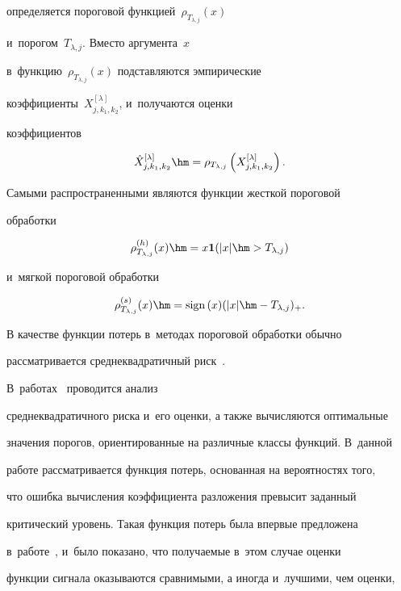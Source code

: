 определяется пороговой функцией~$\rho_{T_{\lambda,j}}(x)$ 


и~порогом~$T_{\lambda,j}$. Вместо аргумента~$x$ 


в~функцию~$\rho_{T_{\lambda,j}}(x)$ подставляются эмпирические  


ко\-эф\-фи\-ци\-ен\-ты~$X_{j,k_1,k_2}^{[\lambda]}$, и~получаются оценки 


коэффициентов 


$$


\hat{X}_{j,k_1,k_2}^{[\lambda]}\hm=\rho_{T_{\lambda,j}}\left(X_{j,k_1,k_2}^{[


\lambda]}\right).


$$


%


 Самыми распространенными являются функции жесткой пороговой 


обработки 


$$


\rho_{T_{\lambda,j}}^{(h)}(x)\hm=x \mathbf{1} 


(|x|\hm>T_{\lambda,j})$$ 


и~мягкой пороговой обработки 


$$


\rho_{T_{\lambda,j}}^{(s)}(x)\hm={\mathrm{sign}}\,(x)(|x|\hm-


T_{\lambda,j})_+.


$$





В качестве функции потерь в~методах пороговой обработки обычно 


рас\-смат\-ри\-ва\-ет\-ся среднеквадратичный риск~\cite{Mal99}. 


В~работах~\cite{Lee97, Abr98, MSH10} проводится анализ 


среднеквадратичного риска и~его оценки, а также вычисляются оптимальные 


значения порогов, ориентированные на различные классы функций. В~данной 


работе рассматривается функция потерь, основанная на вероятностях того, 


что ошибка вычисления коэффициента разложения превысит заданный 


критический уровень. Такая функция потерь была впервые предложена 


в~работе~\cite{SMS14}, и~было показано, что получаемые в~этом случае оценки 


функции сигнала оказываются сравнимыми, а иногда и~лучшими, чем оценки, 


